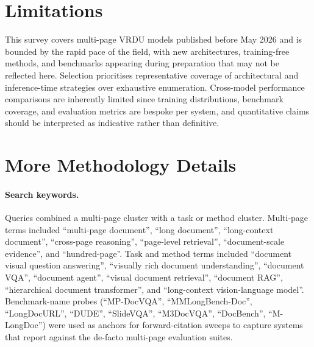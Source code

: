\documentclass[11pt]{article}
\begin{document}
\section*{Limitations}
This survey covers multi-page VRDU models published before May 2026 and is bounded by the rapid pace of the field, with new architectures, training-free methods, and benchmarks appearing during preparation that may not be reflected here. Selection prioritises representative coverage of architectural and inference-time strategies over exhaustive enumeration. Cross-model performance comparisons are inherently limited since training distributions, benchmark coverage, and evaluation metrics are bespoke per system, and quantitative claims should be interpreted as indicative rather than definitive.

%


\clearpage 

\newpage
\appendix

\section{More Methodology Details}
\label{app:methodology}

\paragraph{Search keywords.}
Queries combined a multi-page cluster with a task or method cluster. Multi-page terms included ``multi-page document'', ``long document'', ``long-context document'', ``cross-page reasoning'', ``page-level retrieval'', ``document-scale evidence'', and ``hundred-page''. Task and method terms included ``document visual question answering'', ``visually rich document understanding'', ``document VQA'', ``document agent'', ``visual document retrieval'', ``document RAG'', ``hierarchical document transformer'', and ``long-context vision-language model''. Benchmark-name probes (``MP-DocVQA'', ``MMLongBench-Doc'', ``LongDocURL'', ``DUDE'', ``SlideVQA'', ``M3DocVQA'', ``DocBench'', ``M-LongDoc'') were used as anchors for forward-citation sweeps to capture systems that report against the de-facto multi-page evaluation suites.
\end{document}
